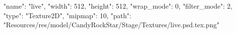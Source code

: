 {
  "name": "live",
  "width": 512,
  "height": 512,
  "wrap_mode": 0,
  "filter_mode": 2,
  "type": "Texture2D",
  "mipmap": 10,
  "path": "Resources/res/model/CandyRockStar/Stage/Textures/live.psd.tex.png"
}